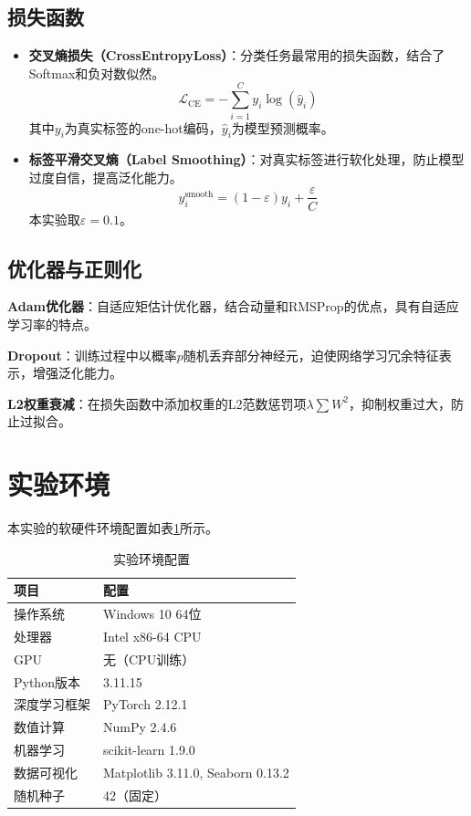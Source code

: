 \documentclass[12pt,a4paper]{ctexart}
\begin{document}
\subsection{损失函数}
\begin{itemize}
  \item \textbf{交叉熵损失（CrossEntropyLoss）}：分类任务最常用的损失函数，结合了Softmax和负对数似然。
        \begin{equation}
        \mathcal{L}_{\text{CE}} = -\sum_{i=1}^{C} y_i \log(\hat{y}_i)
        \label{eq:ce}
        \end{equation}
        其中$y_i$为真实标签的one-hot编码，$\hat{y}_i$为模型预测概率。
  \item \textbf{标签平滑交叉熵（Label Smoothing）}：对真实标签进行软化处理，防止模型过度自信，提高泛化能力。
        \begin{equation}
        y_i^{\text{smooth}} = (1-\varepsilon)y_i + \frac{\varepsilon}{C}
        \label{eq:ls}
        \end{equation}
        本实验取$\varepsilon=0.1$。
\end{itemize}

\subsection{优化器与正则化}
\textbf{Adam优化器}\cite{kingma2014}：自适应矩估计优化器，结合动量和RMSProp的优点，具有自适应学习率的特点。

\textbf{Dropout}\cite{srivastava2014}：训练过程中以概率$p$随机丢弃部分神经元，迫使网络学习冗余特征表示，增强泛化能力。

\textbf{L2权重衰减}：在损失函数中添加权重的L2范数惩罚项$\lambda\sum W^2$，抑制权重过大，防止过拟合。

\section{实验环境}

本实验的软硬件环境配置如表\ref{tab:environment}所示。

\begin{table}[H]
\centering
\caption{实验环境配置}
\label{tab:environment}
\vspace{0.2cm}
\begin{tabular}{ll}
\toprule
\textbf{项目} & \textbf{配置} \\
\midrule
操作系统 & Windows 10 64位 \\
处理器 & Intel x86-64 CPU \\
GPU & 无（CPU训练） \\
Python版本 & 3.11.15 \\
深度学习框架 & PyTorch 2.12.1 \\
数值计算 & NumPy 2.4.6 \\
机器学习 & scikit-learn 1.9.0 \\
数据可视化 & Matplotlib 3.11.0, Seaborn 0.13.2 \\
随机种子 & 42（固定） \\
\bottomrule
\end{tabular}
\end{table}
\end{document}
